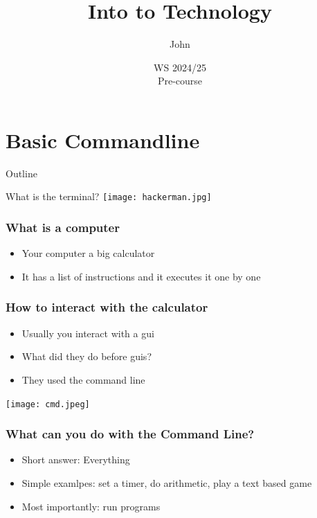 \documentclass[aspectratio=169,hyperref={unicode}]{beamer}
\title{Into to Technology}
\author{John}
\institute{Fachschaft General \& Computational Linguistics\\ \textbf{University of Tübingen}}
\date{WS 2024/25 \\ Pre-course}
\begin{document}
\begin{frame}
\titlepage
\end{frame}

\section{Basic Commandline}

\begin{frame}{Outline}
\tableofcontents[currentsection]
\end{frame}

\begin{frame}

  What is the terminal?
\texttt{[image: hackerman.jpg]}
\end{frame}


\begin{frame}
\frametitle{What is a computer}

\begin{itemize}
\item Your computer a big calculator
        \item It has a list of instructions and it executes it one by one
\end{itemize}
\end{frame}

\begin{frame}
\frametitle{How to interact with the calculator}

\begin{itemize}
\item Usually you interact with a gui
        \item What did they do before guis?
\item They used the command line
\end{itemize}
\texttt{[image: cmd.jpeg]}
\end{frame}
%

\begin{frame}[fragile]
\frametitle{What can you do with the Command Line?}
\begin{itemize}
        \item Short answer: Everything
        \item Simple examlpes: set a timer, do arithmetic, play a text based game
        \item Most importantly: run programs
\end{itemize}
\end{frame}
\end{document}
